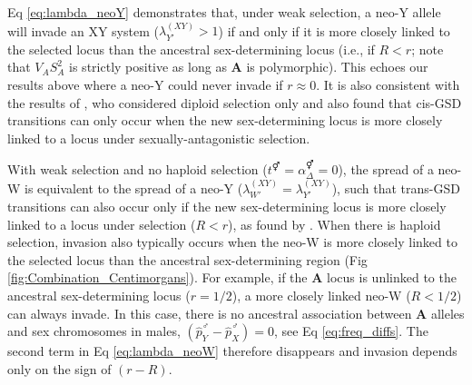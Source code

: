 \documentclass[10pt,letterpaper]{article}
\providecommand{\DIFadd}[1]{{\protect\color{blue}\uwave{#1}}} %
\providecommand{\DIFdel}[1]{{\protect\color{red}\sout{#1}}}                      %
\providecommand{\DIFaddbegin}{} %
\providecommand{\DIFaddend}{} %
\providecommand{\DIFdelbegin}{} %
\providecommand{\DIFdelend}{} %
\begin{document}
Eq \eqref{eq:lambda_neoY} demonstrates that, under weak selection, a neo-Y allele will invade an XY system ($\lambda_{Y'}^{(XY)}>1$) if and only if it is more closely linked to the selected locus than the ancestral sex-determining locus (i.e., if $R<r$; note that $V_{A}S_{A}^2$ is strictly positive as long as $\mathbf{A}$ is polymorphic). 
This echoes our results above where a neo-Y could never invade if $r\approx0$. 
It is also consistent with the results of \cite{vanDoorn:2007eu}, who considered diploid selection only and also found that cis-GSD transitions can only occur when the new sex-determining locus is more closely linked to a locus under sexually-antagonistic selection. 

With weak selection and no haploid selection (\DIFdelbegin \DIFdel{$t^\Hermaphrodite=\alpha^\Hermaphrodite_{\Delta}=0$}\DIFdelend \DIFaddbegin \DIFadd{$t^\circ=\alpha^\circ_{\Delta}=0$}\DIFaddend ), the spread of a neo-W is equivalent to the spread of a neo-Y ($\lambda_{W'}^{(XY)}=\lambda_{Y'}^{(XY)}$), such that trans-GSD transitions can also occur only if the new sex-determining locus is more closely linked to a locus under selection ($R<r$), as found by \cite{vanDoorn:2010hu}. 
When there is haploid selection, invasion also typically occurs when the neo-W is more closely linked to the selected locus than the ancestral sex-determining region (Fig \ref{fig:Combination_Centimorgans}).
For example, if the $\mathbf{A}$ locus is unlinked to the ancestral sex-determining locus ($r=1/2$), a more closely linked neo-W ($R<1/2$) can always invade.
In this case, there is no ancestral association between $\mathbf{A}$ alleles and sex chromosomes in males, $\left( \hat{p}^\male_Y-\hat{p}^\male_X \right)=0$, see Eq \eqref{eq:freq_diffs}. 
The second term in Eq \eqref{eq:lambda_neoW} therefore disappears and invasion depends only on the sign of $(r-R)$.%
\end{document}
